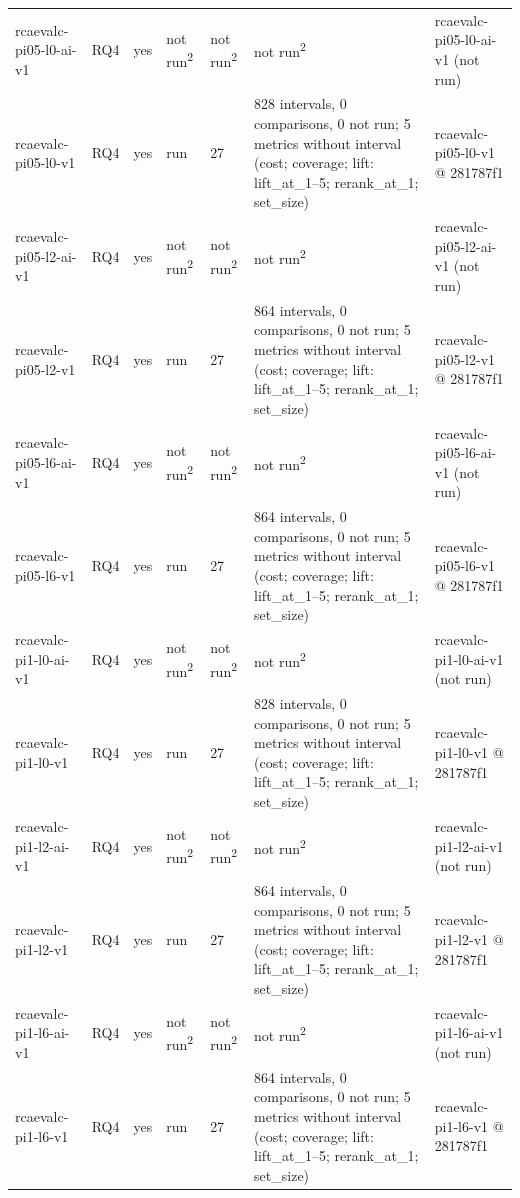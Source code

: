 \begin{table}[t]
\begin{tabular}{lllllll}
rcaevalc-pi05-l0-ai-v1 & RQ4 & yes & not run\textsuperscript{2} & not run\textsuperscript{2} & not run\textsuperscript{2} & rcaevalc-pi05-l0-ai-v1 (not run) \\
rcaevalc-pi05-l0-v1 & RQ4 & yes & run & 27 & 828 intervals, 0 comparisons, 0 not run; 5 metrics without interval (cost; coverage; lift: lift\_at\_1--5; rerank\_at\_1; set\_size) & rcaevalc-pi05-l0-v1 @ 281787f1 \\
rcaevalc-pi05-l2-ai-v1 & RQ4 & yes & not run\textsuperscript{2} & not run\textsuperscript{2} & not run\textsuperscript{2} & rcaevalc-pi05-l2-ai-v1 (not run) \\
rcaevalc-pi05-l2-v1 & RQ4 & yes & run & 27 & 864 intervals, 0 comparisons, 0 not run; 5 metrics without interval (cost; coverage; lift: lift\_at\_1--5; rerank\_at\_1; set\_size) & rcaevalc-pi05-l2-v1 @ 281787f1 \\
rcaevalc-pi05-l6-ai-v1 & RQ4 & yes & not run\textsuperscript{2} & not run\textsuperscript{2} & not run\textsuperscript{2} & rcaevalc-pi05-l6-ai-v1 (not run) \\
rcaevalc-pi05-l6-v1 & RQ4 & yes & run & 27 & 864 intervals, 0 comparisons, 0 not run; 5 metrics without interval (cost; coverage; lift: lift\_at\_1--5; rerank\_at\_1; set\_size) & rcaevalc-pi05-l6-v1 @ 281787f1 \\
rcaevalc-pi1-l0-ai-v1 & RQ4 & yes & not run\textsuperscript{2} & not run\textsuperscript{2} & not run\textsuperscript{2} & rcaevalc-pi1-l0-ai-v1 (not run) \\
rcaevalc-pi1-l0-v1 & RQ4 & yes & run & 27 & 828 intervals, 0 comparisons, 0 not run; 5 metrics without interval (cost; coverage; lift: lift\_at\_1--5; rerank\_at\_1; set\_size) & rcaevalc-pi1-l0-v1 @ 281787f1 \\
rcaevalc-pi1-l2-ai-v1 & RQ4 & yes & not run\textsuperscript{2} & not run\textsuperscript{2} & not run\textsuperscript{2} & rcaevalc-pi1-l2-ai-v1 (not run) \\
rcaevalc-pi1-l2-v1 & RQ4 & yes & run & 27 & 864 intervals, 0 comparisons, 0 not run; 5 metrics without interval (cost; coverage; lift: lift\_at\_1--5; rerank\_at\_1; set\_size) & rcaevalc-pi1-l2-v1 @ 281787f1 \\
rcaevalc-pi1-l6-ai-v1 & RQ4 & yes & not run\textsuperscript{2} & not run\textsuperscript{2} & not run\textsuperscript{2} & rcaevalc-pi1-l6-ai-v1 (not run) \\
rcaevalc-pi1-l6-v1 & RQ4 & yes & run & 27 & 864 intervals, 0 comparisons, 0 not run; 5 metrics without interval (cost; coverage; lift: lift\_at\_1--5; rerank\_at\_1; set\_size) & rcaevalc-pi1-l6-v1 @ 281787f1 \\

\end{tabular}
\end{table}
